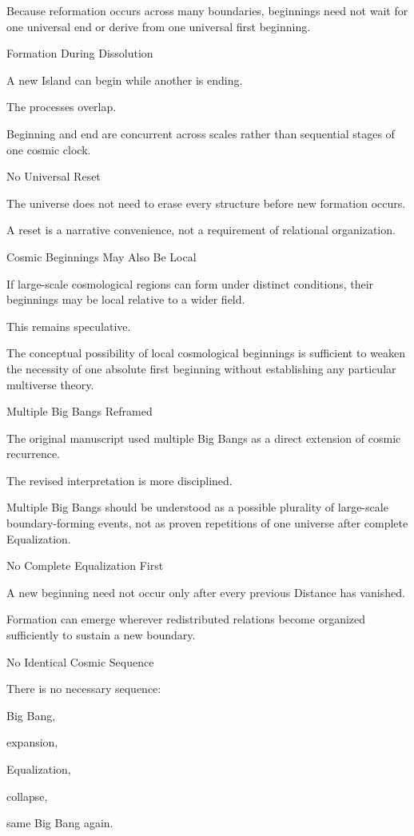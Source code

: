 Because reformation occurs across many boundaries, beginnings need not wait for one universal end or derive from one universal first beginning.

Formation During Dissolution

A new Island can begin while another is ending.

The processes overlap.

Beginning and end are concurrent across scales rather than sequential stages of one cosmic clock.

No Universal Reset

The universe does not need to erase every structure before new formation occurs.

A reset is a narrative convenience, not a requirement of relational organization.

Cosmic Beginnings May Also Be Local

If large-scale cosmological regions can form under distinct conditions, their beginnings may be local relative to a wider field.

This remains speculative.

The conceptual possibility of local cosmological beginnings is sufficient to weaken the necessity of one absolute first beginning without establishing any particular multiverse theory.

Multiple Big Bangs Reframed

The original manuscript used multiple Big Bangs as a direct extension of cosmic recurrence.

The revised interpretation is more disciplined.

Multiple Big Bangs should be understood as a possible plurality of large-scale boundary-forming events, not as proven repetitions of one universe after complete Equalization.

No Complete Equalization First

A new beginning need not occur only after every previous Distance has vanished.

Formation can emerge wherever redistributed relations become organized sufficiently to sustain a new boundary.

No Identical Cosmic Sequence

There is no necessary sequence:

Big Bang,

expansion,

Equalization,

collapse,

same Big Bang again.


